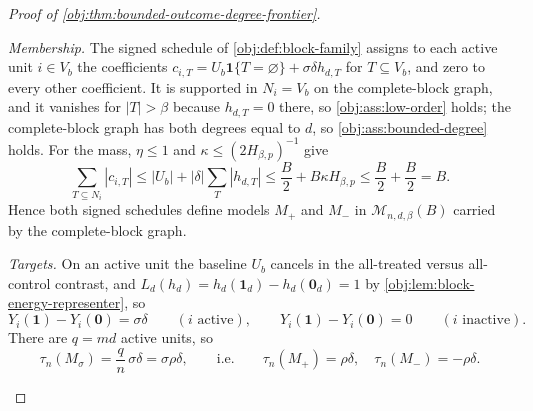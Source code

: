 \documentclass[11pt]{article}
\begin{document}
\begin{proof}[Proof of \cref{obj:thm:bounded-outcome-degree-frontier}]
\begin{enumerate}
\emph{Membership.}  The signed schedule of \cref{obj:def:block-family} assigns to
each active unit \(i\in V_b\) the coefficients
\(c_{i,T}=U_b\mathbf 1\{T=\varnothing\}+\sigma\delta h_{d,T}\) for
\(T\subseteq V_b\), and zero to every other coefficient.  It is supported in
\(N_i=V_b\) on the complete-block graph, and it vanishes for \(|T|>\beta\)
because \(h_{d,T}=0\) there, so \cref{obj:ass:low-order} holds; the complete-block
graph has both degrees equal to \(d\), so \cref{obj:ass:bounded-degree} holds.
For the mass, \(\eta\le1\) and \(\kappa\le(2H_{\beta,p})^{-1}\) give
\[
\sum_{T\subseteq N_i}|c_{i,T}|
\le
|U_b|+|\delta|\sum_T|h_{d,T}|
\le
\frac B2+B\kappa H_{\beta,p}
\le
\frac B2+\frac B2
=B .
\]
Hence both signed schedules define models \(M_+\) and \(M_-\) in
\(\mathcal M_{n,d,\beta}(B)\) carried by the complete-block graph.

\emph{Targets.}  On an active unit the baseline \(U_b\) cancels in the
all-treated versus all-control contrast, and
\(L_d(h_d)=h_d(\mathbf 1_d)-h_d(\mathbf 0_d)=1\) by
\cref{obj:lem:block-energy-representer}, so
\[
Y_i(\mathbf 1)-Y_i(\mathbf 0)=\sigma\delta
\qquad (i\text{ active}),
\qquad
Y_i(\mathbf 1)-Y_i(\mathbf 0)=0
\qquad (i\text{ inactive}).
\]
There are \(q=md\) active units, so
\[
\tau_n(M_\sigma)=\frac{q}{n}\,\sigma\delta=\sigma\rho\delta,
\qquad\text{i.e.}\qquad
\tau_n(M_+)=\rho\delta,
\quad
\tau_n(M_-)=-\rho\delta .
\]


\end{enumerate}
\end{proof}
\end{document}
